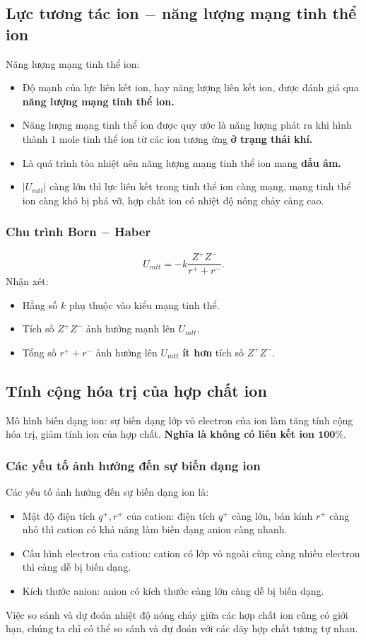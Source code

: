 \subsection{Lực tương tác ion $-$ năng lượng mạng tinh thể ion}
Năng lượng mạng tinh thể ion:
\begin{itemize}
\item Độ mạnh của lực liên kết ion, hay năng lượng liên kết ion, được đánh giá qua \textbf{năng lượng mạng tinh thể ion.}
\item Năng lượng mạng tinh thể ion được quy ước là năng lượng phát ra khi hình thành $1$ mole tinh thể ion từ các ion tương ứng \textbf{ở trạng thái khí.}
\item Là quá trình tỏa nhiệt nên năng lượng mạng tinh thể ion mang \textbf{dấu âm.}
\item $\left| {U_{mtt}} \right|$ càng lớn thì lực liên kết trong tinh thể ion càng mạng, mạng tinh thể ion càng khó bị phá vỡ, hợp chất ion có nhiệt độ nóng chảy càng cao.
\end{itemize}
\subsubsection{Chu trình Born $-$ Haber}
$$U_{mtt} = -k \frac{Z^+ Z^-}{r^+ + r^-}.$$
Nhận xét:
\begin{itemize}
\item Hằng số $k$ phụ thuộc vào kiểu mạng tinh thể.
\item Tích số $Z^+ Z^-$ ảnh hưởng mạnh lên $U_{mtt}.$
\item Tổng số $r^+ + r^-$ ảnh hưởng lên $U_{mtt}$ \textbf{ít hơn} tích số $Z^+ Z^-.$
\end{itemize}
\subsection{Tính cộng hóa trị của hợp chất ion}
Mô hình biến dạng ion: sự biến dạng lớp vỏ electron của ion làm tăng tính cộng hóa trị, giảm tính ion của hợp chất. \textbf{Nghĩa là không có liên kết ion $\mathbf{100 \%.}$}
\subsubsection{Các yếu tố ảnh hưởng đến sự biến dạng ion}
Các yếu tố ảnh hưởng đến sự biến dạng ion là:
\begin{itemize}
\item Mật độ điện tích $q^+, r^+$ của cation: điện tích $q^+$ càng lớn, bán kính $r^+$ càng nhỏ thì cation có khả năng làm biến dạng anion càng nhanh.
\item Cấu hình electron của cation: cation có lớp vỏ ngoài cùng càng nhiều electron thì càng dễ bị biến dạng.
\item Kích thước anion: anion có kích thước càng lớn càng dễ bị biến dạng.
\end{itemize}
Việc so sánh và dự đoán nhiệt độ nóng chảy giữa các hợp chất ion cũng có giới hạn, chúng ta chỉ có thể so sánh và dự đoán với các dãy hợp chất tương tự nhau.
